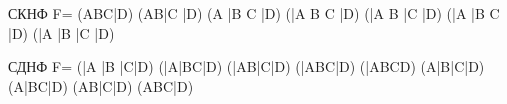 \documentclass{article}
\begin{document}
СКНФ F=
(A\vee B\vee C\vee \bar D) \wedge	(A\vee	B\vee	\bar C	\vee	\bar D) \wedge	(A	\vee	\bar B	\vee	C	\vee	\bar D) \wedge	(\bar A	\vee	B	\vee	C	\vee	\bar D) \wedge	(\bar A	\vee	B	\vee	\bar C	\vee	\bar D) \wedge	(\bar A	\vee	\bar B	\vee	C	\vee	\bar D) \wedge	(\bar A	\vee	\bar B	\vee \bar C	\vee	\bar D)


СДНФ F=
(\bar A \wedge \bar B \wedge \bar C\wedge	\bar D)	\vee	(\bar A\wedge	\bar B\wedge	C\wedge	\bar D)	\vee	(\bar A\wedge	B\wedge	\bar C\wedge	\bar D)	\vee	(\bar A\wedge	B\wedge	C\wedge	\bar D)	\vee	(\bar A\wedge	B\wedge C\wedge	D)	\vee	(A\wedge	\bar B\wedge	\bar C\wedge	\bar D)	\vee	(A\wedge	\bar B\wedge	C\wedge	\bar D)	\vee	(A\wedge	B\wedge	\bar C\wedge	\bar D)	\vee	(A\wedge	B\wedge	C\wedge	\bar D)
\end{document}
